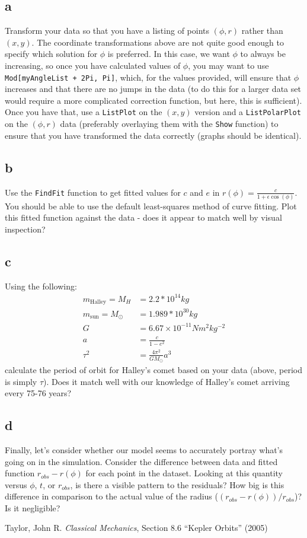 \documentclass{article}
\begin{document}
\subsection{a}
Transform your data so that you have a listing of points $(\phi, r)$ rather than $(x,y)$. The coordinate transformations above are not quite good enough to specify which solution
for $\phi$ is preferred. In this case, we want $\phi$ to always be increasing, so once you have calculated values of $\phi$, you may want to use \texttt{Mod[myAngleList + 2Pi, Pi]}, which,
for the values provided, will ensure that $\phi$ increases and that there are no jumps in the data (to do this for a larger data set would require a more complicated correction function,
but here, this is sufficient). Once you have that, use a \texttt{ListPlot} on the $(x,y)$ version and a \texttt{ListPolarPlot} on the $(\phi,r)$ data (preferably overlaying them with the
\texttt{Show} function) to ensure that you have transformed the data correctly (graphs should be identical).

\subsection{b}
Use the \texttt{FindFit} function to get fitted values for $c$ and $e$ in $r(\phi)=\frac{c}{1+\epsilon\cos(\phi)}$. You should be able to use the default least-squares method of 
curve fitting. Plot this fitted function against the data - does it appear to match well by visual inspection?

\subsection{c}
Using the following:
\begin{align*}
m_{\textrm{Halley}}=M_H&=2.2*10^{14}kg\\
m_{\textrm{sun}}=M_\odot&=1.989*10^{30}kg\\
G&=6.67\times10^{-11}Nm^2kg^{-2}\\
a&=\frac{c}{1-e^2}\\
\tau^2&=\frac{4\pi^2}{GM_\odot}a^3
\end{align*}
calculate the period of orbit for Halley's comet based on your data (above, period is simply $\tau$). Does it match well with our knowledge of Halley's comet arriving every 75-76 years?

\subsection{d}
Finally, let's consider whether our model seems to accurately portray what's going on in the simulation. Consider the difference between data and fitted function $r_{obs}-r(\phi)$ for each
point in the dataset. Looking at this quantity versus $\phi$, $t$, or $r_{obs}$, is there a visible pattern to the residuals? How big is this difference in comparison to the actual
value of the radius ($(r_{obs}-r(\phi))/r_{obs}$)? Is it negligible?

\begin{thebibliography}{9}
Taylor, John R. \emph{Classical Mechanics}, Section 8.6 ``Kepler Orbits'' (2005)
\end{thebibliography}
\end{document}
